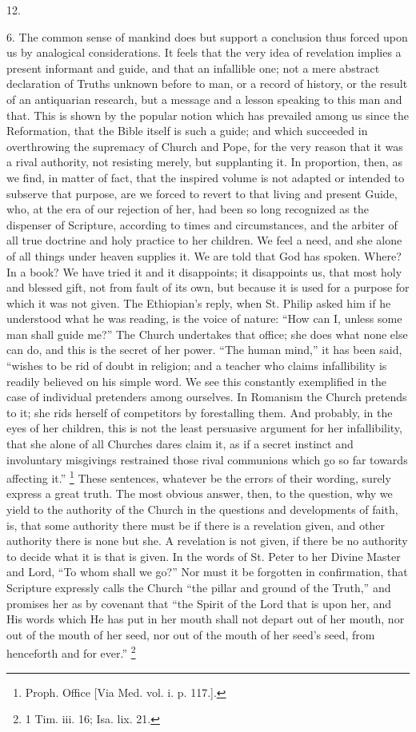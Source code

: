 12.

6. The common sense of mankind does but support a
conclusion thus forced upon us by analogical
considerations. It feels that the very idea of revelation
implies a present informant and guide, and that an
infallible one; not a mere abstract declaration of Truths
unknown before to man, or a record of history, or the
result of an antiquarian research, but a message and a
lesson speaking to this man and that. This is shown by
the popular notion which has prevailed among us since the
Reformation, that the Bible itself is such a guide; and
which succeeded in overthrowing the supremacy of Church
and Pope, for the very reason that it was a rival
authority, not resisting merely, but supplanting it. In
proportion, then, as we find, in matter of fact, that the
inspired volume is not adapted or intended to subserve
that purpose, are we forced to revert to that living and
present Guide, who, at the era of our rejection of her,
had been so long recognized as the dispenser of
Scripture, according to times and circumstances, and the
arbiter of all true doctrine and holy practice to her
children. We feel a need, and she alone of all things
under heaven supplies it. We are told that God has
spoken. Where? In a book? We have tried it and it
disappoints; it disappoints us, that most holy and
blessed gift, not from fault of its own, but because it
is used for a purpose for which it was not given. The
Ethiopian's reply, when St. Philip asked him if he
understood what he was reading, is the voice of nature:
``How can I, unless some man shall guide me?''
The Church undertakes that office; she does what none
else can do, and this is the secret of her power.
``The human mind,'' it has been said,
``wishes to be rid of doubt in religion; and a
teacher who claims infallibility is readily believed on
his simple word. We see this constantly exemplified in
the case of individual pretenders among ourselves. In
Romanism the Church pretends to it; she rids herself of
competitors by forestalling them. And probably, in the
eyes of her children, this is not the least persuasive
argument for her infallibility, that she alone of all
Churches dares claim it, as if a secret instinct and
involuntary misgivings restrained those rival communions
which go so far towards affecting it.'' \footnote{Proph. Office [Via Med. vol.
i. p. 117.].} These
sentences, whatever be the errors of their wording,
surely express a great truth. The most obvious answer,
then, to the question, why we yield to the authority of
the Church in the questions and developments of faith,
is, that some authority there must be if there is a
revelation given, and other authority there is none but
she. A revelation is not given, if there be no authority
to decide what it is that is given. In the words of St.
Peter to her Divine Master and Lord, ``To whom shall
we go?'' Nor must it be forgotten in confirmation,
that Scripture expressly calls the Church ``the
pillar and ground of the Truth,'' and promises her as
by covenant that ``the Spirit of the Lord that is
upon her, and His words which He has put in her mouth
shall not depart out of her mouth, nor out of the mouth
of her seed, nor out of the mouth of her seed's seed,
from henceforth and for ever.'' \footnote{1 Tim. iii. 16; Isa. lix. 21.}


